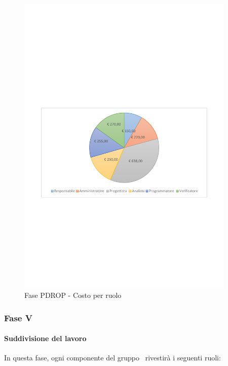 \documentclass[../PianoProgetto.tex]{subfiles}
\begin{document}
\vfill
	\begin{figure}[!h]
		\centering
		\includegraphics[width=0.93\textwidth , trim=2cm 9.5cm 2cm 11cm]{grafici/PDROP/PDROP-costo}
			\caption{Fase PDROP - Costo per ruolo}
		\label{fig:CircleChart-fasePDROP_costo}
	\end{figure}
\vfill	
\newpage
	
	\subsubsection{Fase V}
				\paragraph{Suddivisione del lavoro}
					In questa fase\g, ogni componente del gruppo \leaf\ rivestirà i seguenti ruoli:
	
\end{document}
